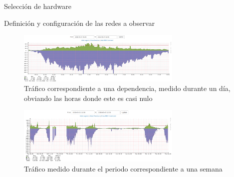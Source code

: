 \begin{section}{Selección de hardware}
\begin{subsection}{Definición y configuración de las redes a observar}
            \begin{figure}[H]
                \centering
                \includegraphics[width=0.7\textwidth]{./iteracion_2_imagenes/figura_35_trafico_dia.png}
                \caption{Tráfico correspondiente a una dependencia, medido durante un día, obviando las horas donde este es casi nulo}
                \label{fig:figura_35_trafico_dia}
            \end{figure}
            \begin{figure}[H]
            \centering
            \includegraphics[width=0.7\textwidth]{./iteracion_2_imagenes/figura_36_trafico_semana.png}
            \caption{Tráfico medido durante el periodo correspondiente a una semana}
            \label{fig:figura_36_trafico_semana}
            \end{figure}
        \end{subsection}
    \end{section}
    
